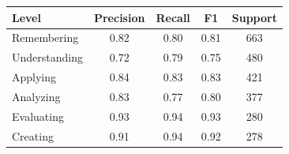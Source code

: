 \begin{tabular}{lcccc}
\hline
Level & Precision & Recall & F1 & Support \\
\hline
Remembering & 0.82 & 0.80 & 0.81 & 663 \\
Understanding & 0.72 & 0.79 & 0.75 & 480 \\
Applying & 0.84 & 0.83 & 0.83 & 421 \\
Analyzing & 0.83 & 0.77 & 0.80 & 377 \\
Evaluating & 0.93 & 0.94 & 0.93 & 280 \\
Creating & 0.91 & 0.94 & 0.92 & 278 \\
\hline
\end{tabular}